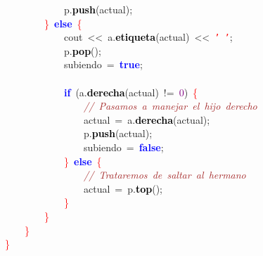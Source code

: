 \mbox{}\ \ \ \ \ \ \ \ \ \ \ \ p\textcolor{BrickRed}{.}\textbf{\textcolor{Black}{push}}\textcolor{BrickRed}{(}actual\textcolor{BrickRed}{);} \\
\mbox{}\ \ \ \ \ \ \ \ \textcolor{Red}{\}}\ \textbf{\textcolor{Blue}{else}}\ \textcolor{Red}{\{} \\
\mbox{}\ \ \ \ \ \ \ \ \ \ \ \ cout\ \textcolor{BrickRed}{\textless{}\textless{}}\ a\textcolor{BrickRed}{.}\textbf{\textcolor{Black}{etiqueta}}\textcolor{BrickRed}{(}actual\textcolor{BrickRed}{)}\ \textcolor{BrickRed}{\textless{}\textless{}}\ \texttt{\textcolor{Red}{'\ '}}\textcolor{BrickRed}{;} \\
\mbox{}\ \ \ \ \ \ \ \ \ \ \ \ p\textcolor{BrickRed}{.}\textbf{\textcolor{Black}{pop}}\textcolor{BrickRed}{();} \\
\mbox{}\ \ \ \ \ \ \ \ \ \ \ \ subiendo\ \textcolor{BrickRed}{=}\ \textbf{\textcolor{Blue}{true}}\textcolor{BrickRed}{;} \\
\mbox{}\ \ \ \ \ \ \ \ \ \ \ \  \\
\mbox{}\ \ \ \ \ \ \ \ \ \ \ \ \textbf{\textcolor{Blue}{if}}\ \textcolor{BrickRed}{(}a\textcolor{BrickRed}{.}\textbf{\textcolor{Black}{derecha}}\textcolor{BrickRed}{(}actual\textcolor{BrickRed}{)}\ \textcolor{BrickRed}{!=}\ \textcolor{Purple}{0}\textcolor{BrickRed}{)}\ \textcolor{Red}{\{} \\
\mbox{}\ \ \ \ \ \ \ \ \ \ \ \ \ \ \ \ \textit{\textcolor{Brown}{//\ Pasamos\ a\ manejar\ el\ hijo\ derecho}} \\
\mbox{}\ \ \ \ \ \ \ \ \ \ \ \ \ \ \ \ actual\ \textcolor{BrickRed}{=}\ a\textcolor{BrickRed}{.}\textbf{\textcolor{Black}{derecha}}\textcolor{BrickRed}{(}actual\textcolor{BrickRed}{);} \\
\mbox{}\ \ \ \ \ \ \ \ \ \ \ \ \ \ \ \ p\textcolor{BrickRed}{.}\textbf{\textcolor{Black}{push}}\textcolor{BrickRed}{(}actual\textcolor{BrickRed}{);} \\
\mbox{}\ \ \ \ \ \ \ \ \ \ \ \ \ \ \ \ subiendo\ \textcolor{BrickRed}{=}\ \textbf{\textcolor{Blue}{false}}\textcolor{BrickRed}{;} \\
\mbox{}\ \ \ \ \ \ \ \ \ \ \ \ \textcolor{Red}{\}}\ \textbf{\textcolor{Blue}{else}}\ \textcolor{Red}{\{}\  \\
\mbox{}\ \ \ \ \ \ \ \ \ \ \ \ \ \ \ \ \textit{\textcolor{Brown}{//\ Trataremos\ de\ saltar\ al\ hermano}} \\
\mbox{}\ \ \ \ \ \ \ \ \ \ \ \ \ \ \ \ actual\ \textcolor{BrickRed}{=}\ p\textcolor{BrickRed}{.}\textbf{\textcolor{Black}{top}}\textcolor{BrickRed}{();} \\
\mbox{}\ \ \ \ \ \ \ \ \ \ \ \ \textcolor{Red}{\}} \\
\mbox{}\ \ \ \ \ \ \ \ \textcolor{Red}{\}} \\
\mbox{}\ \ \ \ \textcolor{Red}{\}} \\
\mbox{}\textcolor{Red}{\}}
